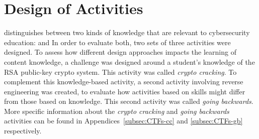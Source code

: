 


\providecommand{\heading}[1]{\section{#1}}
\providecommand{\subheading}[1]{\subsection{#1}}

\heading{Design of Activities}
    \textcite{R-Weiss} distinguishes between two kinds of knowledge that are relevant to cybersecurity education: 
     and  
    In order to evaluate both, two sets of three activities were designed. 
    To assess how different design approaches impacts the learning of content knowledge, a challenge was designed around a student's  knowledge of the RSA public-key crypto system. 
    This activity was called \emph{crypto cracking}. 
    To complement this knowledge-based activity, a second activity involving reverse engineering was created, to evaluate how activities based on skills might differ from those based on knowledge. 
    This second activity was called \emph{going backwards}. 
    More specific information about the \emph{crypto cracking} and \emph{going backwards} activities can be found in Appendices~\ref{subsec:CTFs-cc} and \ref{subsec:CTFs-gb} respectively.

